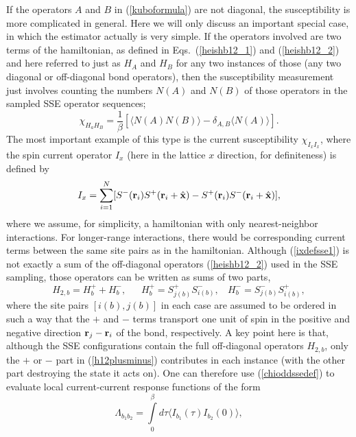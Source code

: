 \documentclass[draft,numberedheadings]{aipproc}
\begin{document}
If the operators $A$ and $B$ in (\ref{kuboformula}) are not diagonal, the susceptibility is more complicated in general. Here we will only discuss an important 
special case, in which the estimator actually is very simple. If the operators involved are two terms of the hamiltonian, as defined in Eqs.~(\ref{heishb12_1})
and (\ref{heishb12_2}) and here referred to just as $H_A$ and $H_B$ for any two instances of those (any two diagonal or off-diagonal bond operators), then 
the susceptibility measurement just involves counting the numbers $N(A)$ and $N(B)$ of those operators in the sampled SSE operator sequences;
\begin{equation}
\chi_{H_aH_B} = \frac{1}{\beta}\left [ \langle N(A)N(B)\rangle -\delta_{A,B}\langle N(A)\rangle \right ].
\label{chioddssedef}
\end{equation}
The most important example of this type is the current susceptibility $\chi_{I_xI_x}$, where the spin current operator $I_x$ (here in the lattice 
$x$ direction, for definiteness) is defined by
\begin{equation}
I_x = \sum_{i=1}^N[ S^-({\bf r}_i)S^+({\bf r}_i+\hat {\bf x}) - S^+({\bf r}_i)S^-({\bf r}_i+\hat {\bf x}) ],
\label{ixdefsse1}
\end{equation}
where we assume, for simplicity, a hamiltonian with only nearest-neighbor interactions. For longer-range interactions, there would be corresponding current
terms between the same site pairs as in the hamiltonian. Although (\ref{ixdefsse1}) is not exactly a sum of the off-diagonal operators (\ref{heishb12_2}) 
used in the SSE sampling, those operators can be written as sums of two parts,
\begin{equation}
H_{2,b}=H^+_{b}+H^-_{b},~~~~~~~H^+_{b}=S^+_{j(b)}S^-_{i(b)},~~~~H^-_{b}=S^-_{j(b)}S^+_{i(b)},
\label{h12plusminus}
\end{equation}
where the site pairs $[i(b),j(b)]$ in each case are assumed to be ordered in such a way that the $+$ and $-$ terms transport one unit of spin in the 
positive and negative direction ${\bf r}_j-{\bf r}_i$ of the bond, respectively. A key point here is that, although the SSE configurations contain the 
full off-diagonal operators $H_{2,b}$, only the $+$ or $-$ part in (\ref{h12plusminus}) contributes in each instance (with the other part destroying the 
state it acts on). One can therefore use (\ref{chioddssedef}) to evaluate local current-current response functions of the form
\begin{equation}
\Lambda_{b_1b_2} = \int\limits_0^\beta d\tau \langle I_{b_1}(\tau)I_{b_2}(0)\rangle,
\label{lambdab1b2}
\end{equation}
\end{document}
